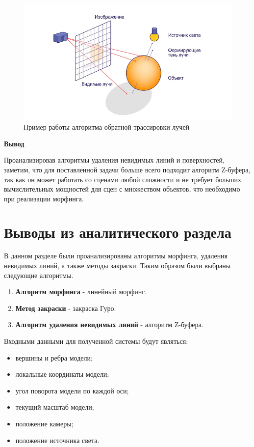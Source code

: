 \begin{figure}[H]
	\centering
	\includegraphics[scale=3]{images/ray_traycing.jpeg}
	\caption{Пример работы алгоритма обратной трассировки лучей}
	\label{fig:ray_traycing}
\end{figure}

\textbf{Вывод}

Проанализировав алгоритмы удаления невидимых линий и поверхностей, заметим, что для поставленной задачи больше всего подходит алгоритм Z-буфера, так как он может работать со сценами любой сложности и не требует больших вычислительных мощностей для сцен с множеством объектов, что необходимо при реализации морфинга.


\section*{Выводы из аналитического раздела}

В данном разделе были проанализированы алгоритмы морфинга, удаления невидимых линий, а также методы закраски.
Таким образом были выбраны следующие алгоритмы.
\begin{enumerate}
	\item \textbf{Алгоритм морфинга} - линейный морфинг.
	\item \textbf{Метод закраски} - закраска Гуро.
	\item \textbf{Алгоритм удаления невидимых линий} - алгоритм Z-буфера.
\end{enumerate}

Входными данными для полученной системы будут являться:
\begin{itemize}
	\item вершины и ребра модели;
	\item локальные координаты модели;
	\item угол поворота модели по каждой оси;
	\item текущий масштаб модели;
	\item положение камеры;
	\item положение источника света.
\end{itemize}